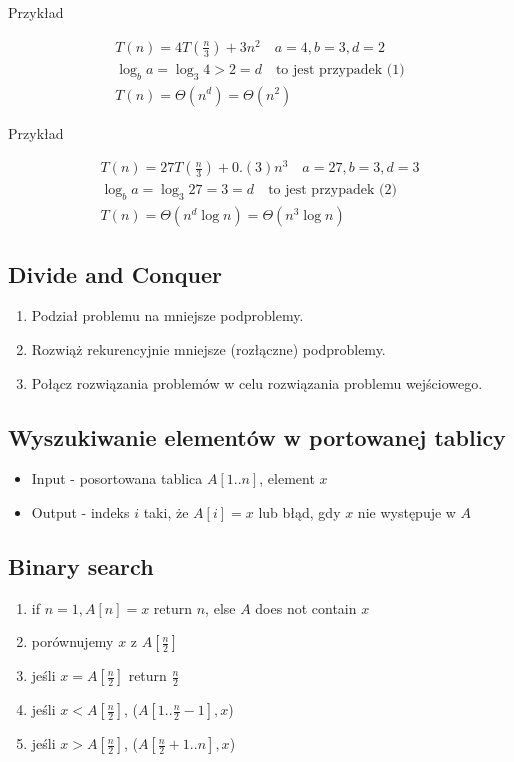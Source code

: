 \documentclass{article}
\begin{document}
\noindent
Przykład

\begin{align}
    T(n) = 4 T\left(\frac{n}{3}\right) + 3n^2 \quad a=4, b=3, d=2\\
    \log_b a = \log_3 4 > 2 = d \quad \text{to jest przypadek (1)}\\
    T(n) = \Theta\left(n^d\right) = \Theta\left(n^2\right)
\end{align}

\noindent
Przykład

\begin{align}
    T(n) = 27T\left(\frac{n}{3}\right) + 0.(3) n^3 \quad a=27, b=3, d=3\\
    \log_b a = \log_3 27 = 3 = d \quad \text{to jest przypadek (2)}\\
    T(n) = \Theta\left(n^d \log n\right) = \Theta\left(n^{3} \log n\right)
\end{align}

\subsection{Divide and Conquer}

\begin{enumerate}
    \item Podział problemu na mniejsze podproblemy.
    \item Rozwiąż rekurencyjnie mniejsze (rozłączne) podproblemy.
    \item Połącz rozwiązania problemów w celu rozwiązania problemu wejściowego.
\end{enumerate}

\subsection{Wyszukiwanie elementów w portowanej tablicy}

\begin{itemize}
    \item Input - posortowana tablica $A[1..n]$, element $x$
    \item Output - indeks $i$ taki, że $A[i] = x$ lub błąd, gdy $x$ nie występuje w $A$
\end{itemize}

\subsection{Binary search}

\begin{enumerate}
    \item if $n=1, A[n] = x$ return $n$, else $A$ does not contain $x$
    \item porównujemy $x$ z $A[\frac{n}{2}]$
    \item jeśli $x = A[\frac{n}{2}]$ return $\frac{n}{2}$
    \item jeśli $x < A[\frac{n}{2}]$, ($A[1..\frac{n}{2}-1], x$)
    \item jeśli $x > A[\frac{n}{2}]$, ($A[\frac{n}{2}+1..n], x$)
\end{enumerate}
\end{document}
